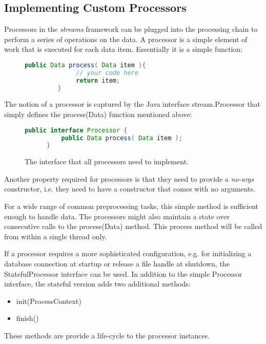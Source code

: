 
\subsection{\label{sec:customProcessors}Implementing Custom Processors}
Processors in the {\em streams} framework can be plugged into the
processing chain to perform a series of operations on the data.  A
processor is a simple element of work that is executed for each data
item. Essentially it is a simple function:

\begin{figure}[h!]
   \centering 
   \begin{lstlisting}[language=Java]
         public Data process( Data item ){
              // your code here
              return item;
         }
   \end{lstlisting}
\end{figure}

The notion of a processor is captured by the Java interface {\ttfamily
stream.Processor} that simply defines the {\ttfamily process(Data)}
function mentioned above:

\begin{figure}[h!]
  \centering
  \begin{lstlisting}[language=Java]
      public interface Processor {
          public Data process( Data item );
      }
  \end{lstlisting}
  \caption{\label{fig:processorInterface}The interface that all processors need to implement.}
\end{figure}

Another property required for processors is that they need to provide
a {\em no-args} constructor, i.e. they need to have a constructor that
comes with no arguments.

For a wide range of common preprocessing tasks, this simple method is
sufficient enough to handle data. The processors might also maintain a
state over consecutive calls to the {\ttfamily process(Data)} method.
This {\ttfamily process} method will be called from within a single
thread only.

If a processor requires a more sophisticated configuration, e.g. for
initializing a database connection at startup or release a file handle
at shutdown, the {\ttfamily StatefulProcessor} interface can be used.
In addition to the simple {\ttfamily Processor} interface, the stateful
version adds two additional methods:
\begin{itemize}
  \item {\ttfamily init(ProcessContext)}
  \item {\ttfamily finish()}
\end{itemize}
These methods are provide a life-cycle to the processor instances.

